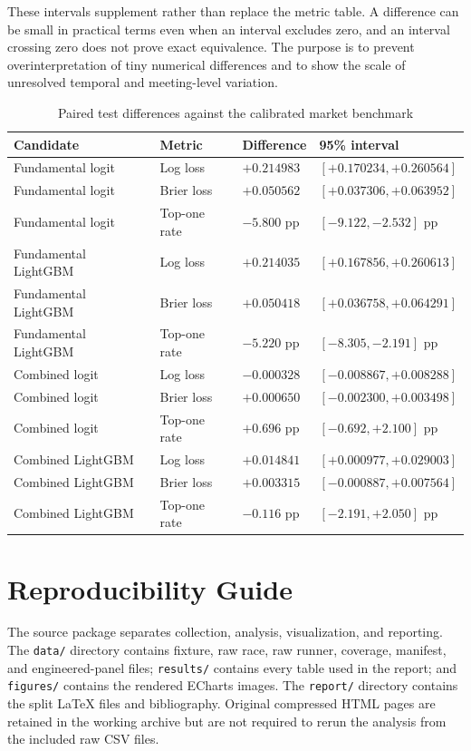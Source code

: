These intervals supplement rather than replace the metric table. A difference can be small in practical terms even when an interval excludes zero, and an interval crossing zero does not prove exact equivalence. The purpose is to prevent overinterpretation of tiny numerical differences and to show the scale of unresolved temporal and meeting-level variation.

\begin{table}[htbp]
\centering
\caption{Paired test differences against the calibrated market benchmark}\label{tab:predictive-full}
\small
\begin{tabular}{L{4.1cm} L{2.5cm} R{2.3cm} R{4.3cm}}
\toprule
\textbf{Candidate} & \textbf{Metric} & \textbf{Difference} & \textbf{95\% interval} \\
\midrule
Fundamental logit & Log loss & $+0.214983$ & $[+0.170234,+0.260564]$ \\
Fundamental logit & Brier loss & $+0.050562$ & $[+0.037306,+0.063952]$ \\
Fundamental logit & Top-one rate & $-5.800$ pp & $[-9.122,-2.532]$ pp \\
\addlinespace
Fundamental LightGBM & Log loss & $+0.214035$ & $[+0.167856,+0.260613]$ \\
Fundamental LightGBM & Brier loss & $+0.050418$ & $[+0.036758,+0.064291]$ \\
Fundamental LightGBM & Top-one rate & $-5.220$ pp & $[-8.305,-2.191]$ pp \\
\addlinespace
Combined logit & Log loss & $-0.000328$ & $[-0.008867,+0.008288]$ \\
Combined logit & Brier loss & $+0.000650$ & $[-0.002300,+0.003498]$ \\
Combined logit & Top-one rate & $+0.696$ pp & $[-0.692,+2.100]$ pp \\
\addlinespace
Combined LightGBM & Log loss & $+0.014841$ & $[+0.000977,+0.029003]$ \\
Combined LightGBM & Brier loss & $+0.003315$ & $[-0.000887,+0.007564]$ \\
Combined LightGBM & Top-one rate & $-0.116$ pp & $[-2.191,+2.050]$ pp \\
\bottomrule
\end{tabular}
\end{table}

\section{Reproducibility Guide}\label{app:reproduction}
The source package separates collection, analysis, visualization, and reporting. The \texttt{data/} directory contains fixture, raw race, raw runner, coverage, manifest, and engineered-panel files; \texttt{results/} contains every table used in the report; and \texttt{figures/} contains the rendered ECharts images. The \texttt{report/} directory contains the split \LaTeX{} files and bibliography. Original compressed HTML pages are retained in the working archive but are not required to rerun the analysis from the included raw CSV files.

